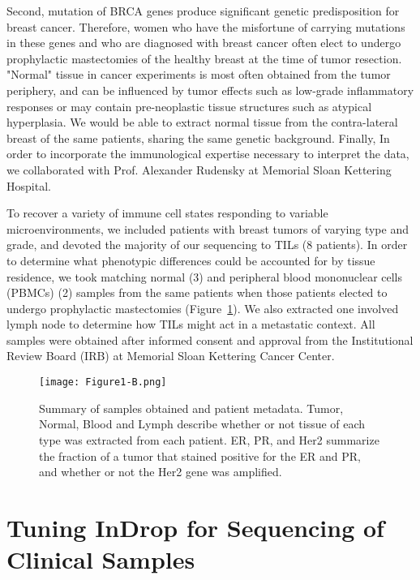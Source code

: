 Second, mutation of BRCA genes produce significant genetic predisposition for breast cancer.
Therefore, women who have the misfortune of carrying mutations in these genes and who are diagnosed with breast cancer often elect to undergo prophylactic mastectomies of the healthy breast at the time of tumor resection. 
"Normal" tissue in cancer experiments is most often obtained from the tumor periphery, and can be influenced by tumor effects such as low-grade inflammatory responses or may contain pre-neoplastic tissue structures such as atypical hyperplasia. 
We would be able to extract normal tissue from the contra-lateral breast of the same patients, sharing the same genetic background. 
Finally, In order to incorporate the immunological expertise necessary to interpret the data, we collaborated with Prof. Alexander Rudensky at Memorial Sloan Kettering Hospital.

To recover a variety of immune cell states responding to variable microenvironments, we included patients with breast tumors of varying type and grade, and devoted the majority of our sequencing to TILs (8 patients). 
In order to determine what phenotypic differences could be accounted for by tissue residence, we took matching normal (3) and peripheral blood mononuclear cells (PBMCs) (2) samples from the same patients when those patients elected to undergo prophylactic mastectomies (Figure~\ref{fig:1b}). 
We also extracted one involved lymph node to determine how TILs might act in a metastatic context.  All samples were obtained after informed consent and approval from the Institutional Review Board (IRB) at Memorial Sloan Kettering Cancer Center.

\begin{figure}
\centering
\texttt{[image: Figure1-B.png]}
\caption{Summary of samples obtained and patient metadata. Tumor, Normal, Blood and Lymph describe whether or not tissue of each type was extracted from each patient. ER, PR, and Her2 summarize the fraction of a tumor that stained positive for the ER and PR, and whether or not the Her2 gene was amplified.} 
\label{fig:1b}
\end{figure} 

\section{Tuning InDrop for Sequencing of Clinical Samples}

